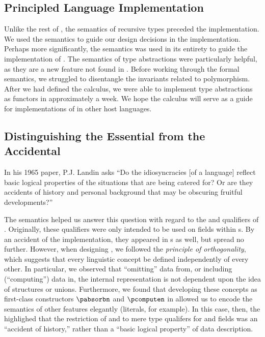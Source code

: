 
\subsection{Principled Language Implementation}

Unlike the rest of \padsc{}, the semantics of recursive types preceded
the implementation. We used the semantics to guide our design
decisions in the implementation. Perhaps more significantly, the
semantics was used in its entirety to guide the implementation of
\padsml{}. The semantics of type abstractions were particularly
helpful, as they are a new feature not found in \padsc{}. Before
working through the formal semantics, we struggled to disentangle the
invariants related to polymorphism. After we had defined the calculus,
we were able to implement type abstractions as \ocaml{} functors in
approximately a week.  We hope the calculus will serve as a guide for
implementations of \pads{} in other host languages.

\subsection{Distinguishing the Essential from the Accidental}

In his 1965 paper, P.J. Landin asks ``Do the idiosyncracies [of a
language] reflect basic logical properties of the situations that are
being catered for?  Or are they accidents of history and personal
background that may be obscuring fruitful developments?''  

The semantics helped us answer this question with regard to the
\Pomit{} and \Pcompute{} qualifiers of \padsc{}.  Originally, these
qualifiers were only intended to be used on fields within \Pstruct{}s.
By an accident of the implementation, they appeared in \Punion{}s as
well, but spread no further. However, when designing \ddc{}, we
followed the {\em principle of orthogonality}, which suggests that
every linguistic concept be defined independently of every other.  In
particular, we observed that ``omitting'' data from, or including
(``computing'') data in, the internal representation is not dependent
upon the idea of structures or unions.  Furthermore, we found that
developing these concepts as first-class constructors $\pabsorbn$ and
$\pcomputen$ in \ddc{} allowed us to encode the semantics of other
\padsc{} features elegantly (literals, for example).  In this case, then, the
\ddc{} highlighed that the restriction of \Pomit{} and \Pcompute{} to
mere type qualifers for \Punion{} and \Pstruct{} fields was an
``accident of history,'' rather than a ``basic logical property'' of
data description.


